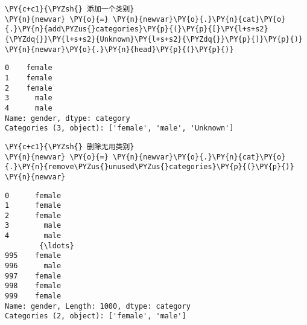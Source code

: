     \begin{tcolorbox}[breakable, size=fbox, boxrule=1pt, pad at break*=1mm,colback=cellbackground, colframe=cellborder]
\begin{Verbatim}[commandchars=\\\{\}]
\PY{c+c1}{\PYZsh{} 添加一个类别}
\PY{n}{newvar} \PY{o}{=} \PY{n}{newvar}\PY{o}{.}\PY{n}{cat}\PY{o}{.}\PY{n}{add\PYZus{}categories}\PY{p}{(}\PY{p}{[}\PY{l+s+s2}{\PYZdq{}}\PY{l+s+s2}{Unknown}\PY{l+s+s2}{\PYZdq{}}\PY{p}{]}\PY{p}{)}
\PY{n}{newvar}\PY{o}{.}\PY{n}{head}\PY{p}{(}\PY{p}{)}
\end{Verbatim}
\end{tcolorbox}

            \begin{tcolorbox}[breakable, size=fbox, boxrule=.5pt, pad at break*=1mm, opacityfill=0]
\begin{Verbatim}[commandchars=\\\{\}]
0    female
1    female
2    female
3      male
4      male
Name: gender, dtype: category
Categories (3, object): ['female', 'male', 'Unknown']
\end{Verbatim}
\end{tcolorbox}
        
    \begin{tcolorbox}[breakable, size=fbox, boxrule=1pt, pad at break*=1mm,colback=cellbackground, colframe=cellborder]
\begin{Verbatim}[commandchars=\\\{\}]
\PY{c+c1}{\PYZsh{} 删除无用类别}
\PY{n}{newvar} \PY{o}{=} \PY{n}{newvar}\PY{o}{.}\PY{n}{cat}\PY{o}{.}\PY{n}{remove\PYZus{}unused\PYZus{}categories}\PY{p}{(}\PY{p}{)}
\PY{n}{newvar}
\end{Verbatim}
\end{tcolorbox}

            \begin{tcolorbox}[breakable, size=fbox, boxrule=.5pt, pad at break*=1mm, opacityfill=0]
\begin{Verbatim}[commandchars=\\\{\}]
0      female
1      female
2      female
3        male
4        male
        {\ldots}
995    female
996      male
997    female
998    female
999    female
Name: gender, Length: 1000, dtype: category
Categories (2, object): ['female', 'male']
\end{Verbatim}
\end{tcolorbox}
